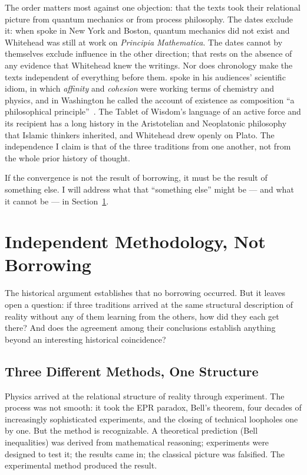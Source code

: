 The order matters most against one objection: that the \bahai texts took their
relational picture from quantum mechanics or from process philosophy.
The dates exclude it: when \AbdulBaha spoke in New York and Boston, quantum
mechanics did not exist and Whitehead was still at work on \textit{Principia
Mathematica}.
The dates cannot by themselves exclude influence in the other direction; that
rests on the absence of any evidence that Whitehead knew the \bahai writings.
Nor does chronology make the \bahai texts independent of everything before them.
\AbdulBaha spoke in his audiences' scientific idiom, in which \emph{affinity} and
\emph{cohesion} were working terms of chemistry and physics, and in Washington he
called the account of existence as composition ``a philosophical
principle''~\citep[Talk 125]{PUP}.
The Tablet of Wisdom's language of an active force and its recipient has a long
history in the Aristotelian and Neoplatonic philosophy that Islamic thinkers
inherited, and Whitehead drew openly on Plato.
The independence I claim is that of the three traditions from one another, not
from the whole prior history of thought.

If the convergence is not the result of borrowing, it must be the result of
something else.
I will address what that ``something else'' might be --- and what it cannot be ---
in Section~\ref{sec:ch6-methodology}.


\section{Independent Methodology, Not Borrowing}
\label{sec:ch6-methodology}

The historical argument establishes that no borrowing occurred.
But it leaves open a question: if three traditions arrived at the same structural
description of reality without any of them learning from the others, how did they
each get there?
And does the agreement among their conclusions establish anything beyond an
interesting historical coincidence?

\subsection*{Three Different Methods, One Structure}

Physics arrived at the relational structure of reality through experiment.
The process was not smooth: it took the EPR paradox, Bell's theorem, four decades
of increasingly sophisticated experiments, and the closing of technical loopholes
one by one.
But the method is recognizable.
A theoretical prediction (Bell inequalities) was derived from mathematical
reasoning; experiments were designed to test it; the results came in; the
classical picture was falsified.
The experimental method produced the result.

